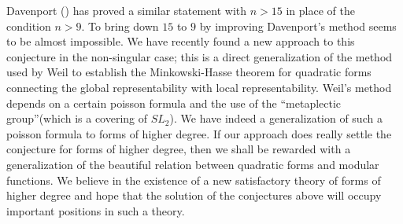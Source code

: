 Davenport (\cite{Dav}) has proved a similar statement with $n>15$ in place of
the condition $n>9$. To bring down $15$ to $9$ by improving
Davenport's method seems to be almost impossible. We have recently
found a new approach to this conjecture in the non-singular case; this
is a direct generalization of the method used by Weil to establish the
Minkowski-Hasse theorem for quadratic forms connecting the global
representability with local representability. Weil's method depends on
a certain poisson formula and the use of the ``metaplectic
group''(which is a covering of $SL_2$). We have indeed a
generalization of such a poisson formula to forms of higher degree. If
our approach does really settle the conjecture for forms of higher
degree, then we shall be rewarded with a generalization of the
beautiful relation between quadratic forms and modular functions. We
believe in the existence of a new satisfactory theory of forms of
higher degree and hope that the solution of the conjectures above will
occupy important positions in such a theory.
